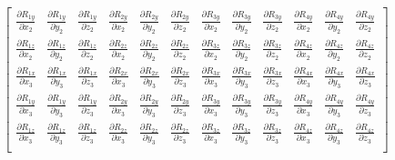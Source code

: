 \begin{eqnarray}
\begin{bmatrix}
\frac{\partial R_{1y}}{\partial x_2} & \frac{\partial R_{1y}}{\partial y_2} & \frac{\partial R_{1y}}{\partial z_2} & \frac{\partial R_{2y}}{\partial x_2} & \frac{\partial R_{2y}}{\partial y_2} & \frac{\partial R_{2y}}{\partial z_2} & \frac{\partial R_{3y}}{\partial x_2} & \frac{\partial R_{3y}}{\partial y_2} & \frac{\partial R_{3y}}{\partial z_2} & \frac{\partial R_{4y}}{\partial x_2} & \frac{\partial R_{4y}}{\partial y_2} & \frac{\partial R_{4y}}{\partial z_2} \\
\frac{\partial R_{1z}}{\partial x_2} & \frac{\partial R_{1z}}{\partial y_2} & \frac{\partial R_{1z}}{\partial z_2} & \frac{\partial R_{2z}}{\partial x_2} & \frac{\partial R_{2z}}{\partial y_2} & \frac{\partial R_{2z}}{\partial z_2} & \frac{\partial R_{3z}}{\partial x_2} & \frac{\partial R_{3z}}{\partial y_2} & \frac{\partial R_{3z}}{\partial z_2} & \frac{\partial R_{4z}}{\partial x_2} & \frac{\partial R_{4z}}{\partial y_2} & \frac{\partial R_{4z}}{\partial z_2} \\
\frac{\partial R_{1x}}{\partial x_3} & \frac{\partial R_{1x}}{\partial y_3} & \frac{\partial R_{1x}}{\partial z_3} & \frac{\partial R_{2x}}{\partial x_3} & \frac{\partial R_{2x}}{\partial y_3} & \frac{\partial R_{2x}}{\partial z_3} & \frac{\partial R_{3x}}{\partial x_3} & \frac{\partial R_{3x}}{\partial y_3} & \frac{\partial R_{3x}}{\partial z_3} & \frac{\partial R_{4x}}{\partial x_3} & \frac{\partial R_{4x}}{\partial y_3} & \frac{\partial R_{4x}}{\partial z_3} \\
\frac{\partial R_{1y}}{\partial x_3} & \frac{\partial R_{1y}}{\partial y_3} & \frac{\partial R_{1y}}{\partial z_3} & \frac{\partial R_{2y}}{\partial x_3} & \frac{\partial R_{2y}}{\partial y_3} & \frac{\partial R_{2y}}{\partial z_3} & \frac{\partial R_{3y}}{\partial x_3} & \frac{\partial R_{3y}}{\partial y_3} & \frac{\partial R_{3y}}{\partial z_3} & \frac{\partial R_{4y}}{\partial x_3} & \frac{\partial R_{4y}}{\partial y_3} & \frac{\partial R_{4y}}{\partial z_3} \\
\frac{\partial R_{1z}}{\partial x_3} & \frac{\partial R_{1z}}{\partial y_3} & \frac{\partial R_{1z}}{\partial z_3} & \frac{\partial R_{2z}}{\partial x_3} & \frac{\partial R_{2z}}{\partial y_3} & \frac{\partial R_{2z}}{\partial z_3} & \frac{\partial R_{3z}}{\partial x_3} & \frac{\partial R_{3z}}{\partial y_3} & \frac{\partial R_{3z}}{\partial z_3} & \frac{\partial R_{4z}}{\partial x_3} & \frac{\partial R_{4z}}{\partial y_3} & \frac{\partial R_{4z}}{\partial z_3} \\

\end{bmatrix}
\end{eqnarray}
